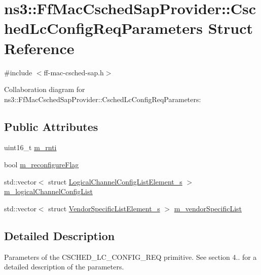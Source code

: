 \hypertarget{structns3_1_1FfMacCschedSapProvider_1_1CschedLcConfigReqParameters}{}\section{ns3\+:\+:Ff\+Mac\+Csched\+Sap\+Provider\+:\+:Csched\+Lc\+Config\+Req\+Parameters Struct Reference}
\label{structns3_1_1FfMacCschedSapProvider_1_1CschedLcConfigReqParameters}


{\ttfamily \#include $<$ff-\/mac-\/csched-\/sap.\+h$>$}



Collaboration diagram for ns3\+:\+:Ff\+Mac\+Csched\+Sap\+Provider\+:\+:Csched\+Lc\+Config\+Req\+Parameters\+:
\subsection*{Public Attributes}
\begin{DoxyCompactItemize}
\item 
uint16\+\_\+t \hyperlink{structns3_1_1FfMacCschedSapProvider_1_1CschedLcConfigReqParameters_a9cc4da30680707163260ad2750a90dd4}{m\+\_\+rnti}
\item 
bool \hyperlink{structns3_1_1FfMacCschedSapProvider_1_1CschedLcConfigReqParameters_a02757cb906634d18fa1f7a3e3390bfcf}{m\+\_\+reconfigure\+Flag}
\item 
std\+::vector$<$ struct \hyperlink{structns3_1_1LogicalChannelConfigListElement__s}{Logical\+Channel\+Config\+List\+Element\+\_\+s} $>$ \hyperlink{structns3_1_1FfMacCschedSapProvider_1_1CschedLcConfigReqParameters_a8b6f9094aef0bbca71cf907d10d09b95}{m\+\_\+logical\+Channel\+Config\+List}
\item 
std\+::vector$<$ struct \hyperlink{structns3_1_1VendorSpecificListElement__s}{Vendor\+Specific\+List\+Element\+\_\+s} $>$ \hyperlink{structns3_1_1FfMacCschedSapProvider_1_1CschedLcConfigReqParameters_ad2114091a283051c400c786db77d2c21}{m\+\_\+vendor\+Specific\+List}
\end{DoxyCompactItemize}


\subsection{Detailed Description}
Parameters of the C\+S\+C\+H\+E\+D\+\_\+\+L\+C\+\_\+\+C\+O\+N\+F\+I\+G\+\_\+\+R\+EQ primitive. See section 4.. for a detailed description of the parameters. 

